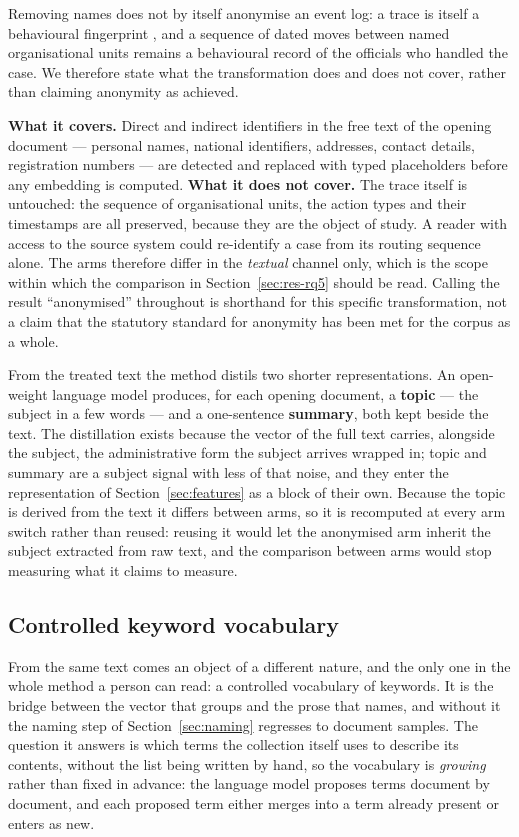 Removing names does not by itself anonymise an event log: a trace is itself a behavioural
fingerprint \citep{mannhardt2019privacy, elkoumy2022privacy}, and a sequence of dated moves
between named organisational units remains a behavioural record of the officials who handled
the case. We therefore state what the transformation does and does not cover, rather than
claiming anonymity as achieved.

\textbf{What it covers.} Direct and indirect identifiers in the free text of the opening
document --- personal names, national identifiers, addresses, contact details, registration
numbers --- are detected and replaced with typed placeholders before any embedding is computed.
\textbf{What it does not cover.} The trace itself is untouched: the sequence of organisational
units, the action types and their timestamps are all preserved, because they are the object of
study. A reader with access to the source system could re-identify a case from its routing
sequence alone. The arms therefore differ in the \emph{textual} channel only, which is the
scope within which the comparison in Section~\ref{sec:res-rq5} should be read. Calling the
result ``anonymised'' throughout is shorthand for this specific transformation, not a claim
that the statutory standard for anonymity has been met for the corpus as a whole.

From the treated text the method distils two shorter representations. An open-weight language
model produces, for each opening document, a \textbf{topic} --- the subject in a few words ---
and a one-sentence \textbf{summary}, both kept beside the text. The distillation exists because
the vector of the full text carries, alongside the subject, the administrative form the subject
arrives wrapped in; topic and summary are a subject signal with less of that noise, and they
enter the representation of Section~\ref{sec:features} as a block of their own. Because the
topic is derived from the text it differs between arms, so it is recomputed at every arm switch
rather than reused: reusing it would let the anonymised arm inherit the subject extracted from
raw text, and the comparison between arms would stop measuring what it claims to measure.

\subsection{Controlled keyword vocabulary}\label{sec:keywords}

From the same text comes an object of a different nature, and the only one in the whole method
a person can read: a controlled vocabulary of keywords. It is the bridge between the vector that
groups and the prose that names, and without it the naming step of Section~\ref{sec:naming}
regresses to document samples. The question it answers is which terms the collection itself uses
to describe its contents, without the list being written by hand, so the vocabulary is
\emph{growing} rather than fixed in advance: the language model proposes terms document by
document, and each proposed term either merges into a term already present or enters as new.

